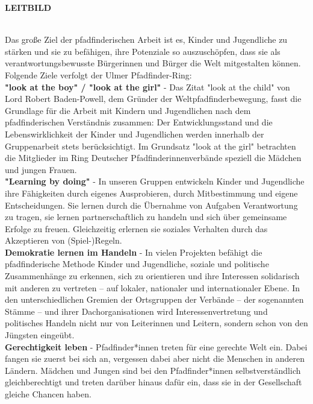 \begin{Large}
    \textbf{LEITBILD}
\end{Large}
\\

Das große Ziel der pfadfinderischen Arbeit ist es, Kinder und Jugendliche zu stärken und sie zu 
befähigen, ihre Potenziale so auszuschöpfen, dass sie als verantwortungsbewusste Bürgerinnen und 
Bürger die Welt mitgestalten können. Folgende Ziele verfolgt der Ulmer Pfadfinder-Ring:
\\

\textbf{"look at the boy" / "look at the girl"} - Das Zitat "look at the child" von Lord Robert 
Baden-Powell, dem Gründer der Weltpfadfinderbewegung, fasst die Grundlage für die Arbeit mit Kindern 
und Jugendlichen nach dem pfadfinderischen Verständnis zusammen: Der Entwicklungsstand und die 
Lebenswirklichkeit der Kinder und Jugendlichen werden innerhalb der Gruppenarbeit stets 
berücksichtigt. Im Grundsatz "look at the girl" betrachten die Mitglieder im Ring Deutscher 
Pfadfinderinnenverbände speziell die Mädchen und jungen Frauen.
\\

\textbf{"Learning by doing"} - In unseren Gruppen entwickeln Kinder und Jugendliche ihre Fähigkeiten 
durch eigenes Ausprobieren, durch Mitbestimmung und eigene Entscheidungen. Sie lernen durch die 
Übernahme von Aufgaben Verantwortung zu tragen, sie lernen partnerschaftlich zu handeln und sich 
über gemeinsame Erfolge zu freuen. Gleichzeitig erlernen sie soziales Verhalten durch das 
Akzeptieren von (Spiel-)Regeln.
\\

\textbf{Demokratie lernen im Handeln} - In vielen Projekten befähigt die pfadfinderische Methode 
Kinder und Jugendliche, soziale und politische Zusammenhänge zu erkennen, sich zu orientieren und 
ihre Interessen solidarisch mit anderen zu vertreten – auf lokaler, nationaler und internationaler 
Ebene. In den unterschiedlichen Gremien der Ortsgruppen der Verbände – der sogenannten Stämme – und 
ihrer Dachorganisationen wird Interessenvertretung und politisches Handeln nicht nur von Leiterinnen 
und Leitern, sondern schon von den Jüngsten eingeübt.
\\

\textbf{Gerechtigkeit leben} - Pfadfinder*innen treten für eine gerechte Welt ein. Dabei fangen sie 
zuerst bei sich an, vergessen dabei aber nicht die Menschen in anderen Ländern. Mädchen und Jungen 
sind bei den Pfadfinder*innen selbstverständlich gleichberechtigt und treten darüber hinaus dafür 
ein, dass sie in der Gesellschaft gleiche Chancen haben.
\\

